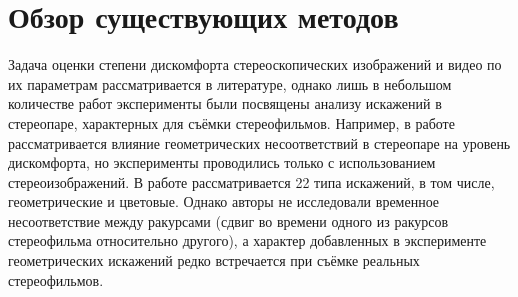 \section{Обзор существующих методов}
Задача оценки степени дискомфорта стереоскопических изображений и видео по их параметрам рассматривается в литературе, однако лишь в небольшом количестве работ эксперименты были посвящены анализу искажений в стереопаре, характерных для съёмки стереофильмов. Например, в работе \cite{khaustova2015objective} рассматривается влияние геометрических несоответствий в стереопаре на уровень дискомфорта, но эксперименты проводились только с использованием стереоизображений. В работе \cite{dumic20173d} рассматривается 22 типа искажений, в том числе, геометрические и цветовые. Однако авторы не исследовали временное несоответствие между ракурсами (сдвиг во времени одного из ракурсов стереофильма относительно другого), а характер добавленных в эксперименте геометрических искажений редко встречается при съёмке реальных стереофильмов.